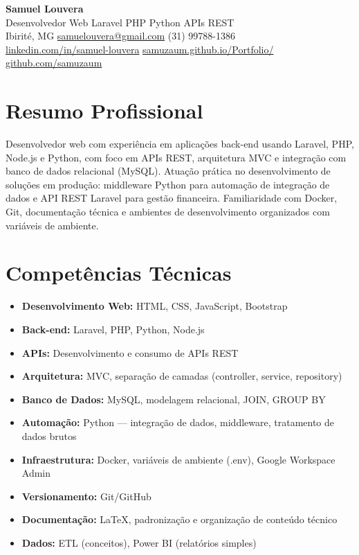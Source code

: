 \documentclass[11pt,a4paper]{article}
\begin{document}
{\LARGE\bfseries Samuel Louvera}\\[3pt]
{\large Desenvolvedor Web \textbar{} Laravel \textbullet{} PHP \textbullet{} Python \textbullet{} APIs REST}\\[5pt]
Ibirité, MG \quad\textbullet\quad
\href{mailto:samuelouvera@gmail.com}{samuelouvera@gmail.com} \quad\textbullet\quad
(31) 99788-1386\\
\href{https://linkedin.com/in/samuel-louvera}{linkedin.com/in/samuel-louvera} \quad\textbullet\quad
\href{https://samuzaum.github.io/Portfolio/}{samuzaum.github.io/Portfolio/} \quad\textbullet\quad
\href{https://github.com/samuzaum}{github.com/samuzaum}

\section{Resumo Profissional}
Desenvolvedor web com experiência em aplicações back-end usando Laravel, PHP, Node.js e Python,
com foco em APIs REST, arquitetura MVC e integração com banco de dados relacional (MySQL).
Atuação prática no desenvolvimento de soluções em produção: middleware Python para automação de
integração de dados e API REST Laravel para gestão financeira. Familiaridade com Docker, Git,
documentação técnica e ambientes de desenvolvimento organizados com variáveis de ambiente.

\section{Competências Técnicas}
\begin{itemize}
  \item \textbf{Desenvolvimento Web:} HTML, CSS, JavaScript, Bootstrap
  \item \textbf{Back-end:} Laravel, PHP, Python, Node.js
  \item \textbf{APIs:} Desenvolvimento e consumo de APIs REST
  \item \textbf{Arquitetura:} MVC, separação de camadas (controller, service, repository)
  \item \textbf{Banco de Dados:} MySQL, modelagem relacional, JOIN, GROUP BY
  \item \textbf{Automação:} Python --- integração de dados, middleware, tratamento de dados brutos
  \item \textbf{Infraestrutura:} Docker, variáveis de ambiente (.env), Google Workspace Admin
  \item \textbf{Versionamento:} Git/GitHub
  \item \textbf{Documentação:} \LaTeX, padronização e organização de conteúdo técnico
  \item \textbf{Dados:} ETL (conceitos), Power BI (relatórios simples)
\end{itemize}
\end{document}
